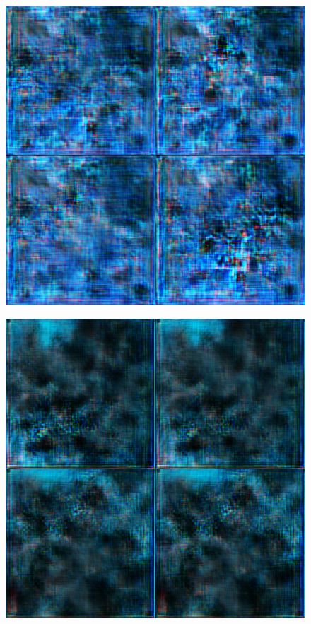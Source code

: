 \begin{figure}[H]
\begin{minipage}{0.24\columnwidth}
		\label{fig:}
	\end{minipage}
	\begin{minipage}{0.24\columnwidth}
		\centering
		\includegraphics[clip, width=\linewidth]{fig/generative_adversarial_nets/0969_0000}
		\label{fig:}
	\end{minipage}
	\begin{minipage}{0.24\columnwidth}
		\centering
		\includegraphics[clip, width=\linewidth]{fig/generative_adversarial_nets/1213_0000}

\end{minipage}
\end{figure}

